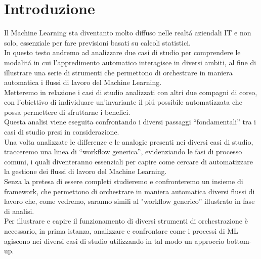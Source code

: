 \documentclass[../tesi.tex]{subfiles}
\begin{document}
\chapter{Introduzione}

Il Machine Learning sta diventanto molto diffuso nelle realtá aziendali IT e non solo, essenziale per fare previsioni basati su calcoli statistici.\\
In questo testo andremo ad analizzare due casi di studio per comprendere le modalitá in cui l’appredimento automatico  interagisce in diversi ambiti, al fine di illustrare una serie di strumenti che permettono di orchestrare in maniera automatica i flussi di lavoro del Machine Learning.\\
Metteremo in relazione i casi di studio analizzati con altri due compagni di corso, con l’obiettivo di individuare un'invariante il piú possibile automatizzata che possa permettere di sfruttarne i benefici.\\
Questa analisi viene eseguita confrontando i diversi passaggi ``fondamentali'' tra i casi di studio presi in considerazione. \\
Una volta analizzate le differenze e le analogie presenti nei diversi casi di studio, tracceremo una linea di ``workflow generica'', evidenziando le fasi di processo comuni, i quali diventeranno essenziali per capire come cercare di automatizzare la gestione dei flussi di lavoro del Machine Learning.\\
Senza la pretesa di essere completi studieremo e confronteremo un insieme di \Gls{framework}, che permettono di orchestrare in maniera automatica diversi flussi di lavoro che, come vedremo, saranno simili al "workflow generico'' illustrato in fase di analisi.\\
Per illustrare e capire il funzionamento di diversi strumenti di orchestrazione è necessario, in prima istanza, analizzare e confrontare come i processi di ML agiscono nei diversi casi di studio utilizzando in tal modo un approccio bottom-up.

\newpage
\end{document}
